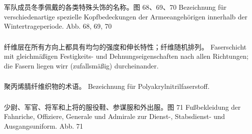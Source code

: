 \subsubsection*{}%

军队成员冬季佩戴的各类特殊头饰的名称。图 68、69、70
Bezeichnung für verschiedenartige spezielle Kopfbedeckungen der Armeeangehörigen innerhalb der Wintertrageperiode. Abb. 68, 69, 70

\subsubsection*{}%

纤维层在所有方向上都具有均匀的强度和伸长特性；纤维随机排列。
Faserschicht mit gleichmäßigen Festigkeits- und Dehnungseigenschaften nach allen Richtungen; die Fasern liegen wirr (zufallsmäßig) durcheinander.

\subsubsection*{}%

聚丙烯腈纤维织物的术语。
Bezeichnung für Polyakrylnitrilfaserstoff.

\subsubsection*{}%

少尉、军官、将军和上将的服役鞋、参谋服和外出服。图 71
Fußbekleidung der Fahnriche, Offiziere, Generale und Admirale zur Dienst-, Stabsdienst- und Ausgangsuniform. Abb. 71